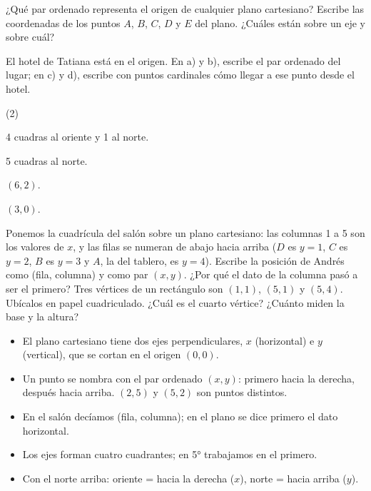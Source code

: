 \documentclass[11pt]{article}
\newcommand{\ejes}[2]{%
  \draw[gray!45] (0,0) grid (#1,#2);
  \draw[->, thick] (0,0) -- (#1+0.5,0) node[right, font=\small] {$x$};
  \draw[->, thick] (0,0) -- (0,#2+0.5) node[above, font=\small] {$y$};
  \foreach \i in {1,...,#1}
    \node[below, font=\scriptsize, text height=1.5ex, text depth=0.25ex] at (\i,0) {\i};
  \foreach \j in {1,...,#2} \node[left, font=\scriptsize] at (0,\j) {\j};
  \node[below left, font=\scriptsize] at (0,0) {0};}
\begin{document}
\begin{preguntas}
\pregunta ¿Qué par ordenado representa el origen de cualquier plano cartesiano?
\pregunta Escribe las coordenadas de los puntos $A$, $B$, $C$, $D$ y $E$ del plano. ¿Cuáles
están sobre un eje y sobre cuál?

\begin{center}
\end{center}
\pregunta El hotel de Tatiana está en el origen. En a) y b), escribe el par ordenado del lugar;
en c) y d), escribe con puntos cardinales cómo llegar a ese punto desde el hotel.
\begin{opciones*}(2)
  \item 4 cuadras al oriente y 1 al norte.
  \item 5 cuadras al norte.
  \item $(6, 2)$.
  \item $(3, 0)$.
\end{opciones*}
\pregunta Ponemos la cuadrícula del salón sobre un plano cartesiano: las columnas 1 a 5 son
los valores de $x$, y las filas se numeran de abajo hacia arriba ($D$ es $y = 1$, $C$ es
$y = 2$, $B$ es $y = 3$ y $A$, la del tablero, es $y = 4$). Escribe la posición de Andrés
como (fila, columna) y como par $(x, y)$. ¿Por qué el dato de la columna pasó a ser el
primero?
\pregunta Tres vértices de un rectángulo son $(1, 1)$, $(5, 1)$ y $(5, 4)$. Ubícalos en papel
cuadriculado. ¿Cuál es el cuarto vértice? ¿Cuánto miden la base y la altura?
\espacio{3.5cm}
\end{preguntas}

\begin{resumen}
\begin{itemize}
  \item El plano cartesiano tiene dos ejes perpendiculares, $x$ (horizontal) e $y$
        (vertical), que se cortan en el origen $(0, 0)$.
  \item Un punto se nombra con el par ordenado $(x, y)$: primero hacia la derecha, después
        hacia arriba. $(2, 5)$ y $(5, 2)$ son puntos distintos.
  \item En el salón decíamos (fila, columna); en el plano se dice primero el dato horizontal.
  \item Los ejes forman cuatro cuadrantes; en 5° trabajamos en el primero.
  \item Con el norte arriba: oriente = hacia la derecha ($x$), norte = hacia arriba ($y$).
\end{itemize}
\end{resumen}
\end{document}
